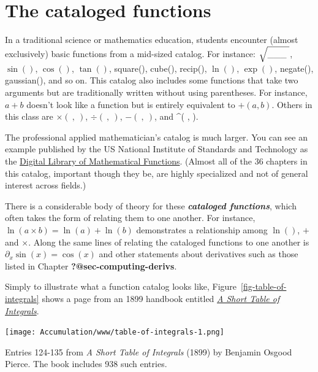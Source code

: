 \documentclass[
  letterpaper,
  DIV=11,
  numbers=noendperiod,
  oneside]{scrreprt}
\begin{document}
\hypertarget{sec-cataloged-functions}{%
\section{The cataloged functions}\label{sec-cataloged-functions}}

In a traditional science or mathematics education, students encounter
(almost exclusively) basic functions from a mid-sized catalog. For
instance: \(\sqrt{\strut\_\_\_\ }\), \(\sin()\), \(\cos()\), \(\tan()\),
square(), cube(), recip(), \(\ln()\), \(\exp()\), negate(), gaussian(),
and so on. This catalog also includes some functions that take two
arguments but are traditionally written without using parentheses. For
instance, \(a+b\) doesn't look like a function but is entirely
equivalent to \(+(a, b)\). Others in this class are \(\times(\ ,\ )\),
\(\div(\ , \ )\), \(-(\ ,\ )\), and \^{}( , ).

The professional applied mathematician's catalog is much larger. You can
see an example published by the US National Institute of Standards and
Technology as the \href{https://dlmf.nist.gov/}{Digital Library of
Mathematical Functions}. (Almost all of the 36 chapters in this catalog,
important though they be, are highly specialized and not of general
interest across fields.)

There is a considerable body of theory for these \textbf{\emph{cataloged
functions}}, which often takes the form of relating them to one another.
For instance, \(\ln(a \times b) = \ln(a) + \ln(b)\) demonstrates a
relationship among \(\ln()\), \(+\) and \(\times\). Along the same lines
of relating the cataloged functions to one another is
\(\partial_x \sin(x) = \cos(x)\) and other statements about derivatives
such as those listed in Chapter \textbf{?@sec-computing-derivs}.

Simply to illustrate what a function catalog looks like,
Figure~\ref{fig-table-of-integrals} shows a page from an 1899 handbook
entitled
\href{https://archive.org/details/integralstable00peirrich/page/114/mode/2up}{\emph{A
Short Table of Integrals}}.

\begin{marginfigure}

{\centering \texttt{[image: Accumulation/www/table-of-integrals-1.png]}

}

\caption{\label{fig-table-of-integrals}Entries 124-135 from \emph{A
Short Table of Integrals} (1899) by Benjamin Osgood Pierce. The book
includes 938 such entries.}

\end{marginfigure}
\end{document}
